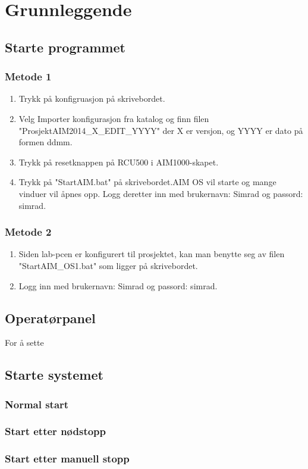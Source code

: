 \section{Grunnleggende}
\subsection{Starte programmet}
\subsubsection*{Metode 1}
\begin{enumerate}
	\item Trykk på konfigruasjon på skrivebordet.
  \item Velg Importer konfigurasjon fra katalog og finn filen "ProsjektAIM2014\_X\_EDIT\_YYYY" der X er versjon, og YYYY er dato på formen ddmm.
  \item Trykk på resetknappen på RCU500 i AIM1000-skapet.
	\item Trykk på "StartAIM.bat" på skrivebordet.AIM OS vil starte og mange vinduer vil åpnes opp. Logg deretter inn med brukernavn: Simrad og passord: simrad. 
\end{enumerate}

\subsubsection*{Metode 2}
\begin{enumerate}
  \item Siden lab-pcen er konfigurert til prosjektet, kan man benytte seg av filen "StartAIM\_OS1.bat" som ligger på skrivebordet.
  \item Logg inn med brukernavn: Simrad og passord: simrad.
\end{enumerate}

\subsection{Operatørpanel}
For å sette 

\subsection{Starte systemet}
\subsubsection*{Normal start}
\subsubsection*{Start etter nødstopp}
\subsubsection*{Start etter manuell stopp}
